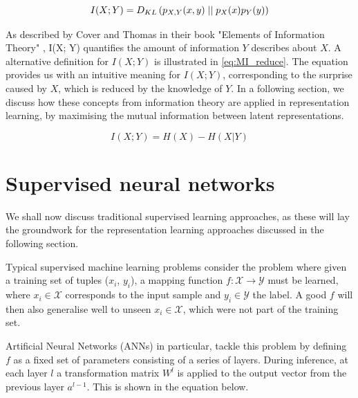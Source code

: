 \begin{equation}
	I(X; Y) =  D_{KL} \left( p_{X, Y}(x, y) \mid \mid p_X(x) p_Y(y) \right)
\end{equation}

As described by Cover and Thomas in their book "Elements of Information Theory" \cite{coverELEMENTSINFORMATIONTHEORY}, I(X; Y) quantifies the amount of information $Y$ describes about $X$. A alternative definition for $I(X;Y)$ is illustrated in \ref{eq:MI_reduce}. The equation provides us with an intuitive meaning for $I(X;Y)$, corresponding to the surprise caused by $X$, which is reduced by the knowledge of $Y$. In a following section, we discuss how these concepts from information theory are applied in representation learning, by maximising the mutual information between latent representations.

\begin{equation}
	I(X;Y)= H(X) - H(X|Y) \label{eq:MI_reduce}
\end{equation}



\section{Supervised neural networks}


We shall now discuss traditional supervised learning approaches, as these will lay the groundwork for the representation learning approaches discussed in the following section. 

Typical supervised machine learning problems consider the problem where given a training set of tuples ($x_i$, $y_i$), a mapping function $f: \mathcal{X} \rightarrow \mathcal{Y}$ must be learned, where $x_i \in \mathcal{X}$ corresponds to the input sample and $y_i \in \mathcal{Y}$ the label. A good $f$ will then also generalise well to unseen $x_i \in \mathcal{X}$, which were not part of the training set.

Artificial Neural Networks (ANNs) in particular, tackle this problem by defining $f$ as a fixed set of parameters consisting of a series of layers. During inference, at each layer $l$ a transformation matrix $W^l$ is applied to the output vector from the previous layer $a^{l-1}$. This is shown in the equation below.

